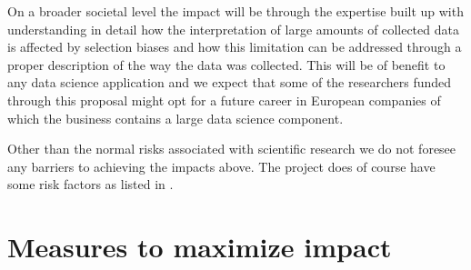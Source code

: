 On a broader societal level the impact will be through the expertise built up with understanding in detail how the interpretation of large amounts of collected data is affected by selection biases and how this limitation can be addressed through a proper description of the way the data was collected. This will be of benefit to any data science application and we expect that some of the researchers funded through this proposal might opt for a future career in European companies of which the business contains a large data science component.

Other than the normal risks associated with scientific research we do not foresee any barriers to achieving the impacts above. The project does of course have some risk factors as listed in .

\section{Measures to maximize impact} 
\label{sec:maximize-impact}

